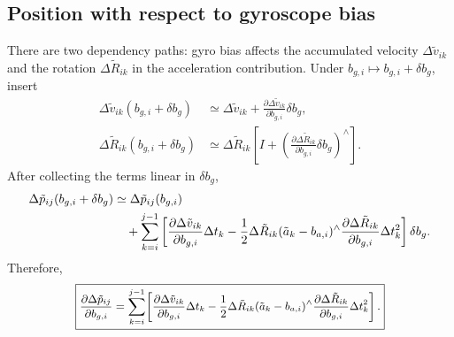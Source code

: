 \documentclass[11pt,a4paper]{article}
\begin{document}
\subsection{Position with respect to gyroscope bias}
There are two dependency paths: gyro bias affects the accumulated
velocity $\Delta\tilde v_{ik}$ and the rotation
$\Delta\tilde R_{ik}$ in the acceleration contribution.
Under $b_{g,i}\mapsto b_{g,i}+\delta b_g$, insert
\begin{align}
\Delta\tilde v_{ik}(b_{g,i}+\delta b_g)
&\simeq\Delta\tilde v_{ik}+\frac{\partial\Delta\tilde v_{ik}}{\partial b_{g,i}}\delta b_g,\\
\Delta\tilde R_{ik}(b_{g,i}+\delta b_g)
&\simeq\Delta\tilde R_{ik}
\left[I+(\frac{\partial\Delta\tilde R_{ik}}{\partial b_{g,i}}\delta b_g)^\wedge\right].
\end{align}
After collecting the terms linear in $\delta b_g$,
\begin{align}
\Delta\tilde p_{ij}(b_{g,i}+\delta b_g)
&\simeq\Delta\tilde p_{ij}(b_{g,i})\notag\\
&\quad+\sum_{k=i}^{j-1}\left[
\frac{\partial\Delta\tilde v_{ik}}{\partial b_{g,i}}\Delta t_k
-\frac12\Delta\tilde R_{ik}
(\tilde a_k-b_{a,i})^\wedge
\frac{\partial\Delta\tilde R_{ik}}{\partial b_{g,i}}\Delta t_k^2
\right]\delta b_g.
\end{align}
Therefore,
\begin{equation}\label{eq:Jpbg_sum}
\begingroup\small
\boxed{\displaystyle
\frac{\partial\Delta\tilde p_{ij}}{\partial b_{g,i}}
=\sum_{k=i}^{j-1}\!\left[
\frac{\partial\Delta\tilde v_{ik}}{\partial b_{g,i}}\Delta t_k
-\frac12\Delta\tilde R_{ik}(\tilde a_k-b_{a,i})^\wedge
\frac{\partial\Delta\tilde R_{ik}}{\partial b_{g,i}}\Delta t_k^2
\right].}
\endgroup
\end{equation}
\end{document}
